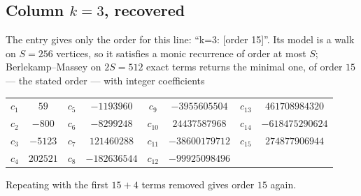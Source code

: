 \documentclass[11pt,a4paper]{article}
\theoremstyle{plain}
\theoremstyle{definition}
\begin{document}
\subsection*{Column $k=3$, recovered}
The entry gives only the order for this line: ``k=3: [order 15]''. Its model is a walk on
$S=256$ vertices, so it satisfies a monic recurrence of order at most $S$;
Berlekamp--Massey on $2S=512$ exact terms returns the minimal one, of order
$15$ --- the stated order --- with integer coefficients
\begin{center}\small\begin{tabular}{cccccccc}
$c_{1}$ & $59$ & $c_{5}$ & $-1193960$ & $c_{9}$ & $-3955605504$ & $c_{13}$ & $461708984320$ \\
$c_{2}$ & $-800$ & $c_{6}$ & $-8299248$ & $c_{10}$ & $24437587968$ & $c_{14}$ & $-618475290624$ \\
$c_{3}$ & $-5123$ & $c_{7}$ & $121460288$ & $c_{11}$ & $-38600179712$ & $c_{15}$ & $274877906944$ \\
$c_{4}$ & $202521$ & $c_{8}$ & $-182636544$ & $c_{12}$ & $-99925098496$ &  &  \\
\end{tabular}\end{center}
Repeating with the first $15+4$ terms removed gives order $15$ again.
\end{document}
